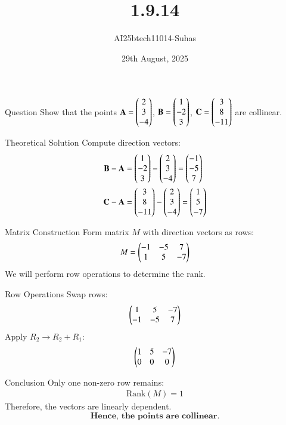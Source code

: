 \documentclass{beamer}
\title{1.9.14}
\date{29th August, 2025}
\author{AI25btech11014-Suhas}
\begin{document}
\frame{\titlepage}

\begin{frame}{Question}
Show that the points  
$\mathbf{A} = \begin{pmatrix}2\\3\\-4\end{pmatrix}$,  
$\mathbf{B} = \begin{pmatrix}1\\-2\\3\end{pmatrix}$,  
$\mathbf{C} = \begin{pmatrix}3\\8\\-11\end{pmatrix}$  
are collinear.
\end{frame}

\begin{frame}{Theoretical Solution}
Compute direction vectors:  
\begin{align}
\mathbf{B} - \mathbf{A} &= \begin{pmatrix}1\\-2\\3\end{pmatrix} - \begin{pmatrix}2\\3\\-4\end{pmatrix} = \begin{pmatrix}-1\\-5\\7\end{pmatrix} \\
\mathbf{C} - \mathbf{A} &= \begin{pmatrix}3\\8\\-11\end{pmatrix} - \begin{pmatrix}2\\3\\-4\end{pmatrix} = \begin{pmatrix}1\\5\\-7\end{pmatrix}
\end{align}
\end{frame}

\begin{frame}{Matrix Construction}
Form matrix $M$ with direction vectors as rows:
\begin{align}
M = \begin{pmatrix}-1 & -5 & 7\\1 & 5 & -7\end{pmatrix}
\end{align}
We will perform row operations to determine the rank.
\end{frame}

\begin{frame}{Row Operations}
Swap rows:
\begin{align}
\begin{pmatrix}1 & 5 & -7\\-1 & -5 & 7\end{pmatrix}
\end{align}
Apply $R_2 \rightarrow R_2 + R_1$:
\begin{align}
\begin{pmatrix}1 & 5 & -7\\0 & 0 & 0\end{pmatrix}
\end{align}
\end{frame}

\begin{frame}{Conclusion}
Only one non-zero row remains:
\begin{align}
\text{Rank}(M) = 1
\end{align}
Therefore, the vectors are linearly dependent.  
\[
\textbf{Hence, the points are collinear.}
\]
\end{frame}
\end{document}
